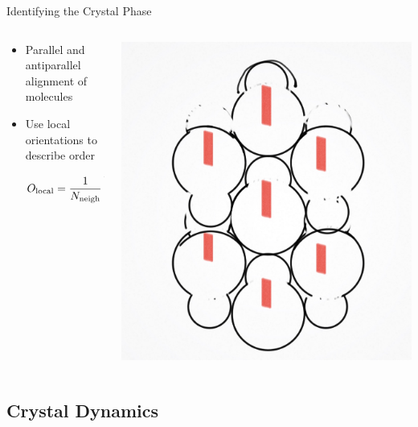 \documentclass[16pt, aspectratio=43,compress]{beamer}
\begin{document}
\begin{frame}{Identifying the Crystal Phase}
    \begin{columns}
        \begin{column}{0.5\linewidth}
            \begin{itemize}
                \item Parallel and antiparallel alignment of molecules
                \item Use local orientations to describe order
                    \begin{align*}
                        O_\text{local} &= \frac{1}{N_\text{neigh}}\sum_{i=1}^{N_\text{neigh}} (\mathbf{\hat e} \cdot \mathbf{\hat e_i})^2
                    \end{align*}
            \end{itemize}
        \end{column}
        \begin{column}{0.5\linewidth}
            \includegraphics[width=\linewidth]{local-orientation}
        \end{column}
    \end{columns}
\end{frame}

\subsection{Crystal Dynamics}
\end{document}
